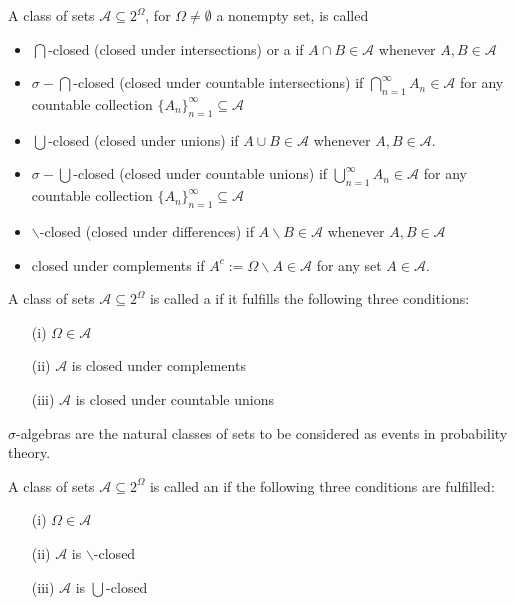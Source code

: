 \documentclass[12pt, a4paper, oneside, openright, titlepage]{book}
\begin{document}
\begin{defn}
    A class of sets $\mathcal{A} \subseteq 2^{\Omega}$, for $\Omega \neq \emptyset$ a nonempty set, is called \begin{itemize}
        \item $\bigcap$-closed (closed under intersections) or a  if $A\cap B \in \mathcal{A}$ whenever $A,B \in \mathcal{A}$
        \item $\sigma-\bigcap$-closed (closed under countable intersections) if $\bigcap_{n=1}^{\infty}A_n\in \mathcal{A}$ for any countable collection $\{A_n\}_{n=1}^{\infty}\subseteq \mathcal{A}$
        \item $\bigcup$-closed (closed under unions) if $A\cup B \in \mathcal{A}$ whenever $A,B \in \mathcal{A}$.
        \item $\sigma-\bigcup$-closed (closed under countable unions) if $\bigcup_{n=1}^{\infty}A_n\in \mathcal{A}$ for any countable collection $\{A_n\}_{n=1}^{\infty}\subseteq \mathcal{A}$
        \item $\backslash$-closed (closed under differences) if $A\backslash B\in \mathcal{A}$ whenever $A,B \in \mathcal{A}$
        \item closed under complements if $A^c:= \Omega\backslash A \in \mathcal{A}$ for any set $A \in \mathcal{A}$.
    \end{itemize}
\end{defn}

\begin{defn}
    A class of sets $\mathcal{A} \subseteq 2^{\Omega}$ is called a  if it fulfills the following three conditions: \begin{itemize}
        \item[(i)] $\Omega \in \mathcal{A}$
        \item[(ii)] $\mathcal{A}$ is closed under complements
        \item[(iii)] $\mathcal{A}$ is closed under countable unions
    \end{itemize}
\end{defn}

$\sigma$-algebras are the natural classes of sets to be considered as events in probability theory.

\begin{defn}
    A class of sets $\mathcal{A} \subseteq 2^{\Omega}$ is called an  if the following three conditions are fulfilled: \begin{itemize}
        \item[(i)] $\Omega \in \mathcal{A}$ 
        \item[(ii)] $\mathcal{A}$ is $\backslash$-closed
        \item[(iii)] $\mathcal{A}$ is $\bigcup$-closed
    \end{itemize}
\end{defn}
\end{document}
